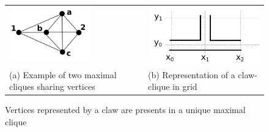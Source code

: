  
 
 
\begin{figure}[ht]
  \centering
  \begin{tabular}{  p{5cm} p{0.7cm} p{5cm} }
    \includegraphics[width=3.5cm]{img/lemaClaw2Maximais} & &
    \includegraphics[width=5.5cm]{img/claw2}
    \\
    \footnotesize %
    (a)  \footnotesize Example of two maximal cliques sharing vertices && \footnotesize (b) Representation  of a claw-clique in grid\\
  \end{tabular}

 \caption{Vertices represented by a claw are presents in a unique maximal clique} \label{fig:lemaClaw2Maximais}
\end{figure}